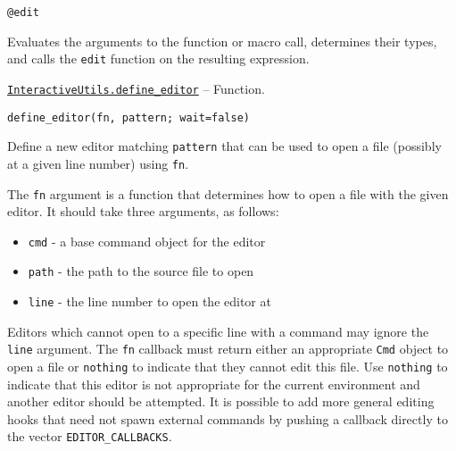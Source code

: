\begin{adjustwidth}{2em}{0pt}


\begin{verbatim}
@edit
\end{verbatim}

Evaluates the arguments to the function or macro call, determines their types, and calls the \texttt{edit} function on the resulting expression.



\end{adjustwidth}
\hypertarget{7329923191421757530}{} 
\hyperlink{7329923191421757530}{\texttt{InteractiveUtils.define\_editor}}  -- {Function.}

\begin{adjustwidth}{2em}{0pt}


\begin{verbatim}
define_editor(fn, pattern; wait=false)
\end{verbatim}

Define a new editor matching \texttt{pattern} that can be used to open a file (possibly at a given line number) using \texttt{fn}.

The \texttt{fn} argument is a function that determines how to open a file with the given editor. It should take three arguments, as follows:

\begin{itemize}
\item \texttt{cmd} - a base command object for the editor


\item \texttt{path} - the path to the source file to open


\item \texttt{line} - the line number to open the editor at

\end{itemize}
Editors which cannot open to a specific line with a command may ignore the \texttt{line} argument. The \texttt{fn} callback must return either an appropriate \texttt{Cmd} object to open a file or \texttt{nothing} to indicate that they cannot edit this file. Use \texttt{nothing} to indicate that this editor is not appropriate for the current environment and another editor should be attempted. It is possible to add more general editing hooks that need not spawn external commands by pushing a callback directly to the vector \texttt{EDITOR\_CALLBACKS}.


\end{adjustwidth}

